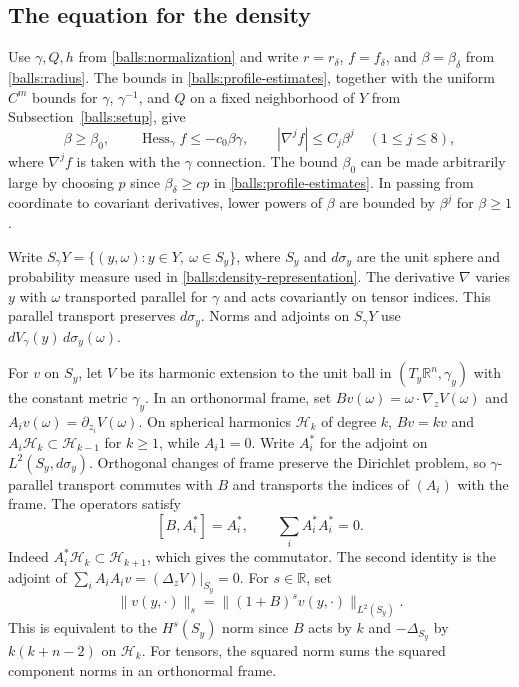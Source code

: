 \documentclass[11pt,a4paper]{article}
\theoremstyle{definition}
\theoremstyle{remark}
\numberwithin{equation}{section}
\begin{document}
\subsection{The equation for the density}

Use $\gamma,Q,h$ from \eqref{balls:normalization} and write
$r=r_\delta$, $f=f_\delta$, and $\beta=\beta_\delta$ from
\eqref{balls:radius}. The bounds in \eqref{balls:profile-estimates},
together with the uniform $C^m$ bounds for $\gamma$, $\gamma^{-1}$,
and $Q$ on a fixed neighborhood of $Y$ from Subsection~\ref{balls:setup},
give
\begin{equation}\label{angular:profile-bounds}
 \beta\ge\beta_0,\qquad
 \operatorname{Hess}_\gamma f\le-c_0\beta\gamma,
 \qquad |\nabla^j f|\le C_j\beta^j\quad(1\le j\le8),
\end{equation}
where $\nabla^j f$ is taken with the $\gamma$ connection. The
bound $\beta_0$ can be made arbitrarily large by choosing $p$
since $\beta_\delta\ge cp$ in \eqref{balls:profile-estimates}. In passing
from coordinate to covariant derivatives, lower powers of $\beta$
are bounded by $\beta^j$ for $\beta\ge1$.

Write $S_\gamma Y=\{(y,\omega):y\in Y,\ \omega\in S_y\}$, where
$S_y$ and $d\sigma_y$ are the unit sphere and probability measure
used in \eqref{balls:density-representation}. The derivative $\nabla$
varies $y$ with $\omega$ transported parallel for $\gamma$ and acts
covariantly on tensor indices.
This parallel transport preserves $d\sigma_y$. Norms and adjoints
on $S_\gamma Y$ use $dV_\gamma(y)\,d\sigma_y(\omega)$.

For $v$ on $S_y$, let $V$ be its harmonic extension to the unit ball
in $(T_y\mathbb R^n,\gamma_y)$ with the constant metric $\gamma_y$.
In an orthonormal frame, set $Bv(\omega)=\omega\cdot\nabla_z V(\omega)$
and $A_iv(\omega)=\partial_{z_i}V(\omega)$. On spherical harmonics
$\mathcal H_k$ of degree $k$, $Bv=kv$ and
$A_i\mathcal H_k\subset\mathcal H_{k-1}$ for $k\ge1$, while $A_i1=0$.
Write $A_i^*$ for the adjoint on $L^2(S_y,d\sigma_y)$.
Orthogonal changes of frame preserve the Dirichlet problem, so
$\gamma$-parallel transport commutes with $B$ and transports the
indices of $(A_i)$ with the frame. The operators satisfy
\begin{equation}\label{angular:elementary-identities}
 [B,A_i^*]=A_i^*,\qquad \sum_i A_i^*A_i^*=0.
\end{equation}
Indeed $A_i^*\mathcal H_k\subset\mathcal H_{k+1}$, which gives the
commutator. The second identity is the adjoint of
$\sum_i A_iA_iv=(\Delta_zV)|_{S_y}=0$.
For $s\in\mathbb R$, set
\[
 \|v(y,\cdot)\|_s=\|(1+B)^s v(y,\cdot)\|_{L^2(S_y)}.
\]
This is equivalent to the $H^s(S_y)$ norm since $B$ acts by $k$
and $-\Delta_{S_y}$ by $k(k+n-2)$ on $\mathcal H_k$. For tensors,
the squared norm sums the squared component norms in an orthonormal frame.
\end{document}

